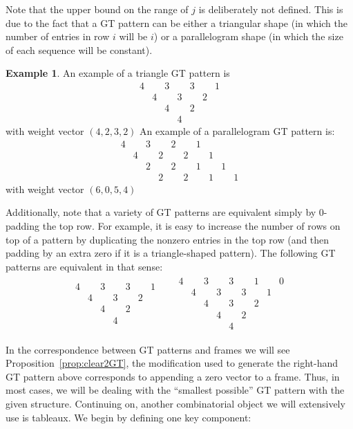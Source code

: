 \documentclass[10pt]{article}
\theoremstyle{plain}
\theoremstyle{definition}
\newtheorem{example}[thm]{Example}
\begin{document}
Note that the upper bound on the range of $j$ is deliberately not defined. This is due to the fact that a GT pattern can be either a triangular shape (in which the number of entries in row $i$ will be $i$) or a parallelogram shape (in which the size of each sequence will be constant).

\begin{example}
An example of a triangle GT pattern is
\[
\begin{matrix}
4 & & 3 & & 3 & & 1 \\
& 4 & & 3 & & 2 & \\ 
& & 4 & & 2 & & \\ 
& & & 4 & & & 
\end{matrix}
\]
with weight vector $(4, 2, 3, 2)$
An example of a parallelogram GT pattern is: 
\[
\begin{matrix}
4 & & 3 & & 2 & & 1 & & \\
&4 & & 2 & & 2 & & 1 & &  \\
&&2 & & 2 & & 1 & & 1 & \\
&&&2 & & 2 & & 1 & & 1 
\end{matrix}
\]
with weight vector $(6,0,5,4)$
\end{example}

Additionally, note that a variety of GT patterns are equivalent simply by 0-padding the top row. For example, it is easy to increase the number of rows on top of a pattern by duplicating the nonzero entries in the top row (and then padding by an extra zero if it is a triangle-shaped pattern). The following GT patterns are equivalent in that sense:
\begin{align*}
\begin{matrix}
4 & & 3 & & 3 & & 1 \\
& 4 & & 3 & & 2 & \\ 
& & 4 & & 2 & & \\ 
& & & 4 & & & 
\end{matrix}
&& 
\begin{matrix}
4& & 3 & & 3 & & 1 & & 0\\
&4 & & 3 & & 3 & & 1 \\
&& 4 & & 3 & & 2 & \\ 
&& & 4 & & 2 & & \\ 
&& & & 4 & & & 
\end{matrix}
\end{align*}

In the correspondence between GT patterns and frames we will see Proposition~\ref{prop:clear2GT}, the modification used to generate the right-hand GT pattern above corresponds to appending a zero vector to a frame. Thus, in most cases, we will be dealing with the ``smallest possible'' GT pattern with the given structure.
Continuing on, another combinatorial object we will extensively use is tableaux. We begin by defining one key component:
\end{document}
